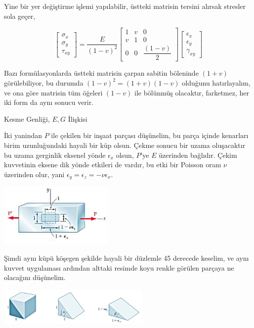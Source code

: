 \documentclass[12pt,fleqn]{article}\usepackage{../../common}
\begin{document}
Yine bir yer değiştirme işlemi yapılabilir, üstteki matrisin tersini alırsak
stresler sola geçer, 

$$
\left[\begin{array}{c}
\sigma_x \\ \sigma_y \\ \tau_{xy}
\end{array}\right] = 
\frac{E}{(1-v)^2}
\left[\begin{array}{ccc}
1 & v & 0 \\ v & 1 & 0 \\ 0 & 0 & \dfrac{(1-v)}{2}
\end{array}\right]
\left[\begin{array}{c}
\epsilon_{x} \\ \epsilon_{y} \\ \gamma_{xy}
\end{array}\right] 
$$

Bazı formülasyonlarda üstteki matrisin çarpan sabitin böleninde $(1+v)$
görülebiliyor, bu durumda $(1-v)^2=(1+v)(1-v)$ olduğunu hatırlayalım, ve ona
göre matrisin tüm öğeleri $(1-v)$ ile bölünmüş olacaktır, farketmez, her iki
form da aynı sonucu verir.

Kesme Genliği, $E,G$ İlişkisi

İki yanindan $P$ ile çekilen bir inşaat parçası düşünelim, bu parça içinde
kenarları birim uzunluğundaki hayali bir küp olsun. Çekme sonucu bir uzama
oluşacaktır bu uzama gerginlik eksenel yönde $\epsilon_x$ olsun, $P$'ye
$E$ üzerinden bağlıdır. Çekim kuvvetinin eksene dik yönde etkileri de vardır,
bu etki bir Poisson oranı $\nu$ üzerinden olur, yani
$\epsilon_y = \epsilon_z = -\nu \epsilon_x$.

\includegraphics[width=15em]{phy_020_strs_06_07.jpg}

Şimdi aynı küpü köşegen şekilde hayali bir düzlemle 45 derecede keselim, ve aynı
kuvvet uygulaması ardından alttaki resimde koyu renkle görülen parçaya
ne olacağını düşünelim.

\includegraphics[width=20em]{phy_020_strs_06_08.jpg}
\end{document}
